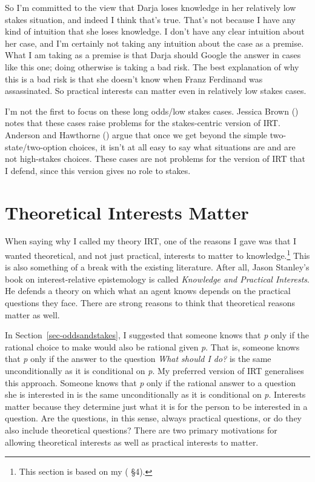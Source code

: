 \documentclass[
  10pt,
  letterpaper,
  twoside]{scrbook}
\begin{document}
So I'm committed to the view that Darja loses knowledge in her
relatively low stakes situation, and indeed I think that's true. That's
not because I have any kind of intuition that she loses knowledge. I
don't have any clear intuition about her case, and I'm certainly not
taking any intuition about the case as a premise. What I am taking as a
premise is that Darja should Google the answer in cases like this one;
doing otherwise is taking a bad risk. The best explanation of why this
is a bad risk is that she doesn't know when Franz Ferdinand was
assassinated. So practical interests can matter even in relatively low
stakes cases.

I'm not the first to focus on these long odds/low stakes cases. Jessica
Brown () notes that these cases raise
problems for the stakes-centric version of IRT. Anderson and Hawthorne
() argue that once we get
beyond the simple two-state/two-option choices, it isn't at all easy to
say what situations are and are not high-stakes choices. These cases are
not problems for the version of IRT that I defend, since this version
gives no role to stakes.

\section{Theoretical Interests Matter}\label{sec-whatinterests}

When saying why I called my theory IRT, one of the reasons I gave was
that I wanted theoretical, and not just practical, interests to matter
to knowledge.\footnote{This section is based on my
  ( §4).} This is also
something of a break with the existing literature. After all, Jason
Stanley's book on interest-relative epistemology is called
\emph{Knowledge and Practical Interests}. He defends a theory on which
what an agent knows depends on the practical questions they face. There
are strong reasons to think that theoretical reasons matter as well.

In Section~\ref{sec-oddsandstakes}, I suggested that someone knows that
\emph{p} only if the rational choice to make would also be rational
given \emph{p}. That is, someone knows that \emph{p} only if the answer
to the question \emph{What should I do?} is the same unconditionally as
it is conditional on \emph{p}. My preferred version of IRT generalises
this approach. Someone knows that \emph{p} only if the rational answer
to a question she is interested in is the same unconditionally as it is
conditional on \emph{p}. Interests matter because they determine just
what it is for the person to be interested in a question. Are the
questions, in this sense, always practical questions, or do they also
include theoretical questions? There are two primary motivations for
allowing theoretical interests as well as practical interests to matter.
\end{document}
